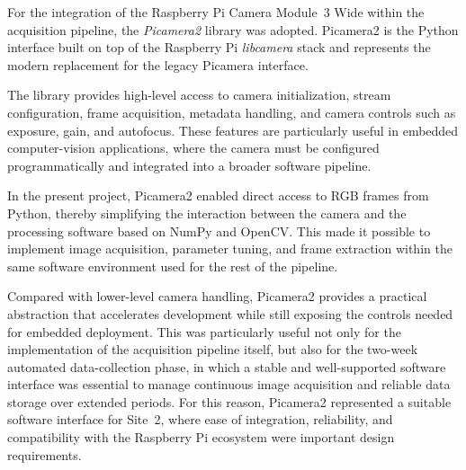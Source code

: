 
For the integration of the Raspberry Pi Camera Module~3 Wide within the acquisition pipeline, the \textit{Picamera2} library was adopted.\cite{raspberrypi_picamera2_manual_2026,raspberrypi_picamera2_github_2026} Picamera2 is the Python interface built on top of the Raspberry Pi \textit{libcamera} stack and represents the modern replacement for the legacy Picamera interface.\cite{raspberrypi_picamera2_github_2026}

The library provides high-level access to camera initialization, stream configuration, frame acquisition, metadata handling, and camera controls such as exposure, gain, and autofocus.\cite{raspberrypi_picamera2_manual_2026} These features are particularly useful in embedded computer-vision applications, where the camera must be configured programmatically and integrated into a broader software pipeline.

In the present project, Picamera2 enabled direct access to RGB frames from Python, thereby simplifying the interaction between the camera and the processing software based on NumPy and OpenCV. This made it possible to implement image acquisition, parameter tuning, and frame extraction within the same software environment used for the rest of the pipeline.

Compared with lower-level camera handling, Picamera2 provides a practical abstraction that accelerates development while still exposing the controls needed for embedded deployment. This was particularly useful not only for the implementation of the acquisition pipeline itself, but also for the two-week automated data-collection phase, in which a stable and well-supported software interface was essential to manage continuous image acquisition and reliable data storage over extended periods. For this reason, Picamera2 represented a suitable software interface for Site~2, where ease of integration, reliability, and compatibility with the Raspberry Pi ecosystem were important design requirements.\cite{raspberrypi_picamera2_manual_2026,raspberrypi_picamera2_github_2026}
